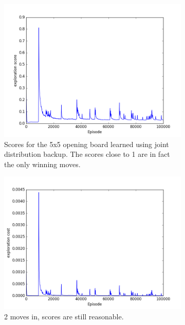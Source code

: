 \documentclass{article}
\begin{document}
\begin{figure}[!ht]
\begin{subfigure}[t]{.45\textwidth}
  \centering
      \includegraphics[width=1\textwidth]{pics/7x7_count_exp_score.png}
  \caption{Scores for the 5x5 opening board learned using joint distribution backup. The scores close to 1 are in fact the only winning moves.}
  \label{fig:5x5_1}
\end{subfigure}\hfill
\begin{subfigure}[t]{.45\textwidth}
  \centering
      \includegraphics[width=1\textwidth]{pics/7x7_count_exp_cost.png}
  \caption{2 moves in, scores are still reasonable.}
  \label{fig:5x5_2}
\end{subfigure}\vfill
\begin{subfigure}[t]{.45\textwidth}

\end{subfigure}
\end{figure}
\end{document}
